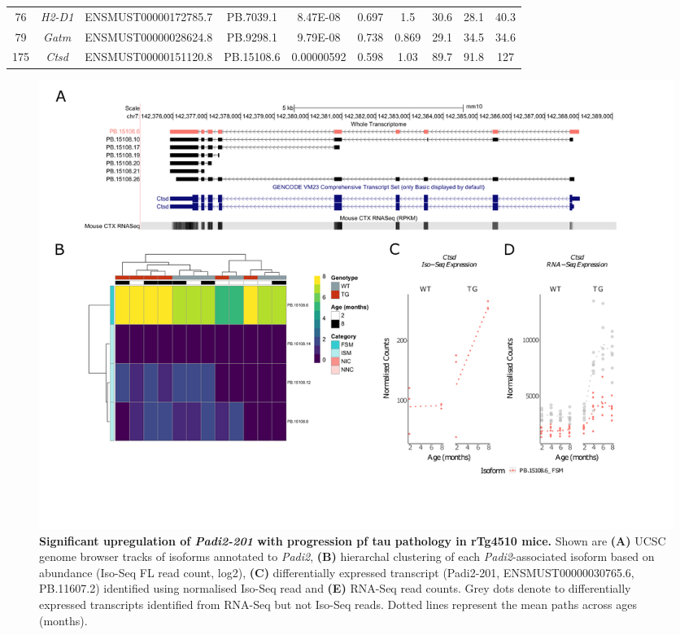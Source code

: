 \begin{landscape}
\begin{table}[]
\begin{tabular}{@{}cccccccccc@{}}
		76  & \textit{H2-D1}  & ENSMUST00000172785.7  & PB.7039.1  & 8.47E-08   & 0.697 & 1.5   & 30.6  & 28.1  & 40.3  \\
		79  & \textit{Gatm}   & ENSMUST00000028624.8  & PB.9298.1  & 9.79E-08   & 0.738 & 0.869 & 29.1  & 34.5  & 34.6  \\
		175 & \textit{Ctsd}   & ENSMUST00000151120.8  & PB.15108.6 & 0.00000592 & 0.598 & 1.03  & 89.7  & 91.8  & 127   \\ \bottomrule
	\end{tabular}
	\label{tab:DEI_trans}
\end{table}
\end{landscape}

\begin{landscape}
	\begin{figure}[!htp]
		\centering
		\includegraphics[page=4,trim={1.5cm 3.5cm 2cm 1cm}, scale = 0.85]{Figures/Ch5_DiffPlots_Landscape.pdf}
		\captionsetup{width=1.5\textwidth}
		\caption[Differential \textit{Padi2} transcript expression]%
		{\textbf{Significant upregulation of \textit{Padi2-201} with progression pf tau pathology in rTg4510 mice.} Shown are \textbf{(A)} UCSC genome browser tracks of isoforms annotated to \textit{Padi2}, \textbf{(B)} hierarchal clustering of each \textit{Padi2}-associated isoform based on abundance (Iso-Seq FL read count, log2), \textbf{(C)} differentially expressed transcript (Padi2-201, ENSMUST00000030765.6, PB.11607.2) identified using normalised Iso-Seq read and \textbf{(E)} RNA-Seq read counts. Grey dots denote to differentially expressed transcripts identified from RNA-Seq but not Iso-Seq reads. Dotted lines represent the mean paths across ages (months).}   
		\label{fig:Padi2}
	\end{figure}	
\end{landscape}

